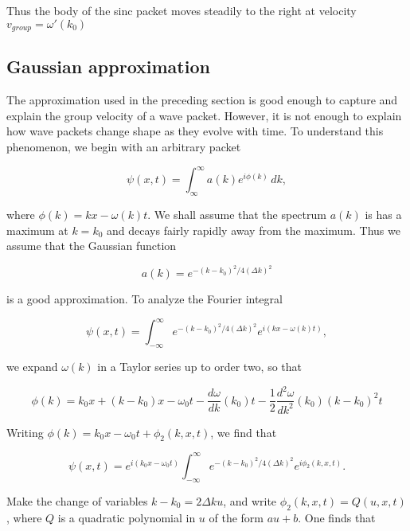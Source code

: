Thus the body of the sinc packet moves steadily to the right at velocity $v_{group} = \omega'(k_0)$


\subsection{Gaussian approximation}

The approximation used in the preceding section is good enough to capture and explain the group velocity of a wave packet.  However, it is not enough to explain how wave packets change shape as they evolve with time.  To understand this phenomenon, we begin with  an arbitrary packet 

\begin{equation}
\psi(x,t) = \int_{\infty}^\infty a(k) e^{i\phi(k)}\,dk,
\end{equation}

where $\phi(k) = kx - \omega(k)t$.  We shall assume that the spectrum $a(k)$ is has a maximum at $k = k_0$ and decays fairly rapidly away from the maximum.  Thus we assume that the Gaussian function

\begin{equation}
a(k) = e^{ -(k-k_0)^2/ 4(\Delta k)^2}
\end{equation}

is a good approximation.  To analyze the Fourier integral

\begin{equation}
\psi(x,t) = \int_{-\infty}^{\infty} e^{ -(k-k_0)^2/ 4(\Delta k)^2} e^{i(kx - \omega(k) t)},
\end{equation}

we expand $\omega(k)$ in a Taylor series up to order two, so that 

\begin{equation}
\phi(k) = k_0x + (k - k_0)x - \omega_0t - \frac{d\omega}{dk}(k_0) t- \frac{1}{2}\frac{ d^2\omega }{ dk^2 }(k_0)( k - k_0)^2 t
\end{equation}

Writing $\phi(k) = k_0x - \omega_0t + \phi_2(k,x,t)$, we find that

\begin{equation}
\psi(x,t) = e^{i(k_0x - \omega_0 t)} \int_{-\infty}^{\infty} e^{ -(k-k_0)^2/ 4(\Delta k)^2} e^{i\phi_2(k,x,t)}.
\end{equation}

Make the change of variables $k - k_0 = 2\Delta k u$, and write $\phi_2(k,x,t) = Q(u,x,t)$, where $Q$ is a quadratic polynomial in $u$ of the form $au + b$. One finds that

